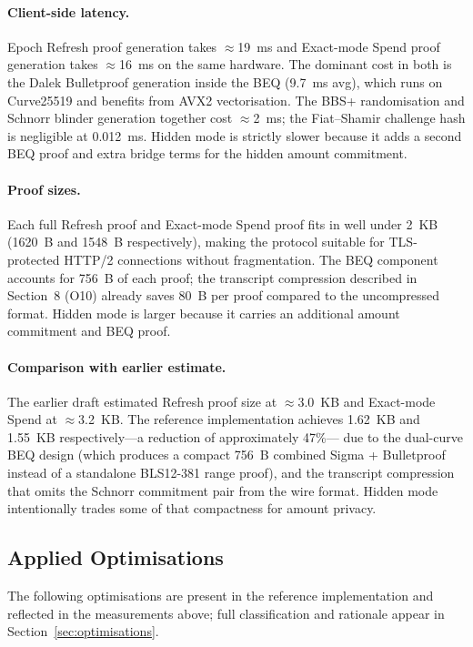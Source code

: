 \documentclass[11pt]{article}
\theoremstyle{definitionstyle}
\theoremstyle{plain}
\begin{document}
\paragraph{Client-side latency.}
Epoch Refresh proof generation takes $\approx$19~ms and Exact-mode Spend proof
generation takes $\approx$16~ms on the same hardware.  The dominant cost
in both is the Dalek Bulletproof generation inside the BEQ (9.7~ms avg),
which runs on Curve25519 and benefits from AVX2 vectorisation.  The
BBS+ randomisation and Schnorr blinder generation together cost
$\approx$2~ms; the Fiat--Shamir challenge hash is negligible at 0.012~ms.
Hidden mode is strictly slower because it adds a second BEQ proof and extra
bridge terms for the hidden amount commitment.

\paragraph{Proof sizes.}
Each full Refresh proof and Exact-mode Spend proof fits in well under 2~KB
(1620~B and 1548~B respectively), making the protocol suitable for TLS-protected
HTTP/2 connections without fragmentation.  The BEQ component accounts
for 756~B of each proof; the transcript compression described in
Section~8 (O10) already saves 80~B per proof compared to the
uncompressed format.  Hidden mode is larger because it carries an additional
amount commitment and BEQ proof.

\paragraph{Comparison with earlier estimate.}
The earlier draft estimated Refresh proof size at $\approx$3.0~KB and
Exact-mode Spend at $\approx$3.2~KB.  The reference implementation achieves
1.62~KB and 1.55~KB respectively—a reduction of approximately 47\%—
due to the dual-curve BEQ design (which produces a compact 756~B
combined Sigma + Bulletproof instead of a standalone BLS12-381 range
proof), and the transcript compression that omits the Schnorr
commitment pair from the wire format.  Hidden mode intentionally trades some
of that compactness for amount privacy.

\subsection{Applied Optimisations}

The following optimisations are present in the reference implementation
and reflected in the measurements above; full classification and
rationale appear in Section~\ref{sec:optimisations}.
\end{document}
